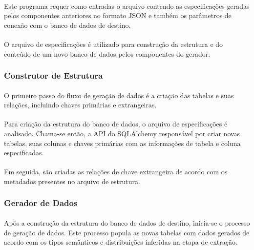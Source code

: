 \paragraph{} Este programa requer como entradas o arquivo contendo as especificações geradas pelos componentes anteriores no formato JSON e também os parâmetros de conexão com o banco de dados de destino.

\paragraph{} O arquivo de especificações é utilizado para construção da estrutura e do conteúdo de um novo banco de dados pelos componentes do gerador.

\subsubsection{Construtor de Estrutura}

\paragraph{} O primeiro passo do fluxo de geração de dados é a criação das tabelas e suas relações, incluindo chaves primárias e extrangeiras.

\paragraph{} Para criação da estrutura do banco de dados, o arquivo de especificações é analisado. Chama-se então, a API do SQLAlchemy responsável por criar novas tabelas, suas colunas e chaves primárias com as informações de tabela e coluna especificadas.

\paragraph{} Em seguida, são criadas as relações de chave extrangeira de acordo com os metadados presentes no arquivo de estrutura.

\subsubsection{Gerador de Dados}

\paragraph{} Após a construção da estrutura do banco de dados de destino, inicia-se o processo de geração de dados. Este processo popula as novas tabelas com dados gerados de acordo com os tipos semânticos e distribuições inferidas na etapa de extração.

